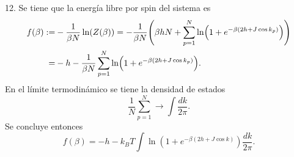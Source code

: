 \documentclass{article}
\begin{document}
12. Se tiene que la energía libre por spin del sistema es
\begin{align}
\begin{split}
f(\beta):=&-\frac{1}{\beta N}\ln(Z(\beta))=-\frac{1}{\beta N}\qty(\beta hN+\sum_{p=1}^N\ln(1+e^{-\beta(2h+J\cos{k_p})}))\\
=&-h-\frac{1}{\beta N}\sum_{p=1}^N\ln(1+e^{-\beta(2h+J\cos{k_p})}).
\end{split}
\end{align}
En el límite termodinámico se tiene la densidad de estados
\begin{equation}
\frac{1}{N}\sum_{p=1}^N\rightarrow\int\frac{dk}{2\pi}.
\end{equation}
Se concluye entonces
\begin{equation}
f(\beta)=-h-k_B T\int \ln(1+e^{-\beta(2h+J\cos{k})})\frac{dk}{2\pi}.
\end{equation}
\end{document}
